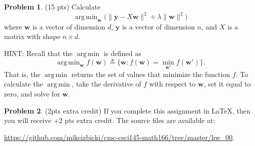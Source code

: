 \documentclass[10pt]{article}
\theoremstyle{definition}
\newtheorem{problem}{Problem}
\DeclareMathOperator*{\argmin}{arg\,min}
\newcommand{\w}{\mathbf w}
\newcommand{\y}{\mathbf y}
\newcommand{\ltwo}[1]{\lVert {#1} \rVert}
\begin{document}
\newpage
\begin{problem}
    (15 pts)
    Calculate 
    \begin{equation}
        \argmin_{\w} \bigg(\ltwo{\y - X\w}^2 + \lambda\ltwo{\w}^2\bigg)
    \end{equation}
    where $\w$ is a vector of dimension $d$,
    $\y$ is a vector of dimension $n$, 
    and $X$ is a matrix with shape $n\times d$.

    HINT: Recall that the $\argmin$ is defined as
    \begin{equation}
        \argmin_\w f(\w) \triangleq \{ \w : f(\w) = \min_{\w'} f(\w') \}
        .
    \end{equation}
    That is, the $\argmin$ returns the set of values that minimize the function $f$.
    To calculate the $\argmin$, take the derivative of $f$ with respect to $\w$, 
    set it equal to zero, 
    and solve for $\w$.
\end{problem}
\vspace{6.5in}
\begin{problem}
    (2pts extra credit)
    If you complete this assignment in \LaTeX, then you will receive +2 pts extra credit.
    The source files are available at: 
    
    \url{https://github.com/mikeizbicki/cmc-csci145-math166/tree/master/hw_00}.
\end{problem}
\end{document}
